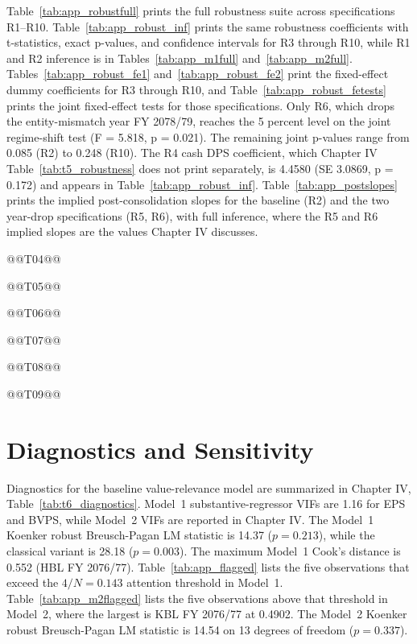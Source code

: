 Table~\ref{tab:app_robustfull} prints the full robustness suite across specifications R1--R10. Table~\ref{tab:app_robust_inf} prints the same robustness coefficients with t-statistics, exact p-values, and confidence intervals for R3 through R10, while R1 and R2 inference is in Tables~\ref{tab:app_m1full} and~\ref{tab:app_m2full}. Tables~\ref{tab:app_robust_fe1} and~\ref{tab:app_robust_fe2} print the fixed-effect dummy coefficients for R3 through R10, and Table~\ref{tab:app_robust_fetests} prints the joint fixed-effect tests for those specifications. Only R6, which drops the entity-mismatch year FY 2078/79, reaches the 5 percent level on the joint regime-shift test (F = 5.818, p = 0.021). The remaining joint p-values range from 0.085 (R2) to 0.248 (R10). The R4 cash DPS coefficient, which Chapter IV Table~\ref{tab:t5_robustness} does not print separately, is 4.4580 (SE 3.0869, p = 0.172) and appears in Table~\ref{tab:app_robust_inf}. Table~\ref{tab:app_postslopes} prints the implied post-consolidation slopes for the baseline (R2) and the two year-drop specifications (R5, R6), with full inference, where the R5 and R6 implied slopes are the values Chapter IV discusses.

@@T04@@

@@T05@@

@@T06@@

@@T07@@

@@T08@@

@@T09@@

\section{Diagnostics and Sensitivity}

Diagnostics for the baseline value-relevance model are summarized in Chapter IV, Table~\ref{tab:t6_diagnostics}. Model~1 substantive-regressor VIFs are 1.16 for EPS and BVPS, while Model~2 VIFs are reported in Chapter IV. The Model~1 Koenker robust Breusch-Pagan LM statistic is 14.37 ($p=0.213$), while the classical variant is 28.18 ($p=0.003$). The maximum Model~1 Cook's distance is 0.552 (HBL FY 2076/77). Table~\ref{tab:app_flagged} lists the five observations that exceed the $4/N=0.143$ attention threshold in Model~1. Table~\ref{tab:app_m2flagged} lists the five observations above that threshold in Model~2, where the largest is KBL FY 2076/77 at 0.4902. The Model~2 Koenker robust Breusch-Pagan LM statistic is 14.54 on 13 degrees of freedom ($p=0.337$).

